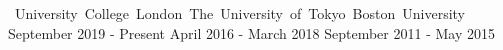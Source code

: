 %
%
%


\begin{cventries}

    {\vspace*{-0.45cm}\mbox{\hspace{17.5mm} University College London
        \hspace{3.5mm} The University of Tokyo \hspace{3.75mm} Boston University}}
    {}
    {}
    {\hspace{17.6mm} \small{September 2019 - Present}
        \hspace{16.4mm} \small{April 2016 - March 2018}
        \hspace{15.65mm} \small{September 2011 - May 2015}}

\vspace*{-0.2cm}
\end{cventries}
